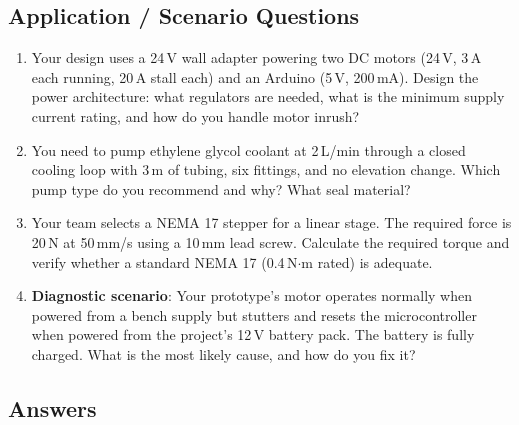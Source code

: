 \documentclass[11pt,letterpaper,twoside,openany]{book}
\begin{document}
\subsection{Application / Scenario Questions}

\begin{enumerate}[resume,leftmargin=1.5em]
  \item Your design uses a 24\,V wall adapter powering two DC motors (24\,V, 3\,A each running, 20\,A stall each) and an Arduino (5\,V, 200\,mA). Design the power architecture: what regulators are needed, what is the minimum supply current rating, and how do you handle motor inrush?

  \item You need to pump ethylene glycol coolant at 2\,L/min through a closed cooling loop with 3\,m of tubing, six fittings, and no elevation change. Which pump type do you recommend and why? What seal material?

  \item Your team selects a NEMA 17 stepper for a linear stage. The required force is 20\,N at 50\,mm/s using a 10\,mm lead screw. Calculate the required torque and verify whether a standard NEMA 17 (0.4\,N$\cdot$m rated) is adequate.

  \item \textbf{Diagnostic scenario}: Your prototype's motor operates normally when powered from a bench supply but stutters and resets the microcontroller when powered from the project's 12\,V battery pack. The battery is fully charged. What is the most likely cause, and how do you fix it?
\end{enumerate}

\subsection{Answers}
\end{document}
